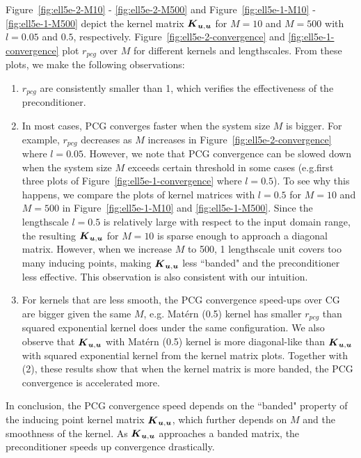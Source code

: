 Figure~\ref{fig:ell5e-2-M10} - \ref{fig:ell5e-2-M500}
and Figure~\ref{fig:ell5e-1-M10} - \ref{fig:ell5e-1-M500}
depict the kernel matrix $\boldsymbol{K}_{\boldsymbol{u}, \boldsymbol{u}}$ for $M=10$ and $M=500$
with $l=0.05$ and $0.5$, respectively.
Figure~\ref{fig:ell5e-2-convergence} and \ref{fig:ell5e-1-convergence}
plot $r_{pcg}$ over $M$ for different kernels and lengthscales.
From these plots, we make the following observations:

\begin{enumerate}[(1)]


   \item $r_{pcg}$ are consistently smaller than 1,
   which verifies the effectiveness of the preconditioner.

   \item In most cases, PCG converges faster when the system size $M$ is bigger. For example, $r_{pcg}$ decreases as $M$ increases in Figure~\ref{fig:ell5e-2-convergence} where $l=0.05$.  However, we note that 
     PCG convergence can be slowed down when the system size $M$ exceeds certain threshold in some cases (e.g.first three plots of Figure~\ref{fig:ell5e-1-convergence} where $l=0.5$). 
    To see why this happens, we compare the plots of kernel matrices with $l=0.5$ 
    for $M=10$ and $M=500$ in Figure~\ref{fig:ell5e-1-M10} and \ref{fig:ell5e-1-M500}.
    Since the lengthscale $l=0.5$ is relatively large
    with respect to the input domain range, the resulting $\boldsymbol{K}_{\boldsymbol{u}, \boldsymbol{u}}$ for $M=10$ is sparse enough to approach a diagonal matrix. 
    However, when we increase $M$ to 500,
    1 lengthscale unit covers too many inducing points, 
    making $\boldsymbol{K}_{\boldsymbol{u}, \boldsymbol{u}}$ less ``banded" and the preconditioner less effective. 
    This observation is also consistent with our intuition.
    
      \item For kernels that are less smooth, the PCG convergence
   speed-ups over CG are bigger given the same $M$,
   e.g.  Matérn (0.5) kernel has smaller $r_{pcg}$
   than squared exponential kernel does under the same configuration.
   We also observe that $\boldsymbol{K}_{\boldsymbol{u}, \boldsymbol{u}}$ with Matérn (0.5) kernel is more diagonal-like
   than $\boldsymbol{K}_{\boldsymbol{u}, \boldsymbol{u}}$ with squared exponential kernel from the kernel matrix plots.
   Together with (2),
   these results show that when the kernel matrix is more banded, the PCG convergence is accelerated more.
\end{enumerate}

In conclusion, the PCG convergence speed depends
on the ``banded" property of the inducing point kernel matrix $\boldsymbol{K}_{\boldsymbol{u}, \boldsymbol{u}}$,
which further depends on $M$ and the smoothness of the kernel. As $\boldsymbol{K}_{\boldsymbol{u}, \boldsymbol{u}}$ approaches a banded matrix,
the preconditioner speeds up convergence drastically. 


